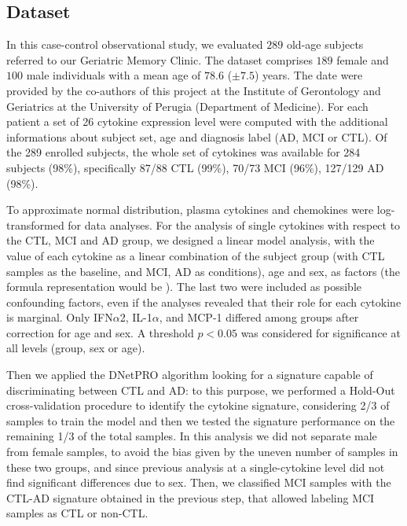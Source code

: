 \documentclass{standalone}
\begin{document}
\subsection[Dataset]{Dataset}\label{cytokine:cytokine_data}

In this case-control observational study, we evaluated $289$ old-age subjects referred to our Geriatric Memory Clinic.
The dataset comprises $189$ female and $100$ male individuals with a mean age of $78.6$ ($\pm7.5$) years.
The date were provided by the co-authors of this project at the Institute of Gerontology and Geriatrics at the University of Perugia (Department of Medicine).
For each patient a set of 26 cytokine expression level were computed with the additional informations about subject set, age and diagnosis label (AD, MCI or CTL).
Of the 289 enrolled subjects, the whole set of cytokines was available for 284 subjects (98\%), specifically 87/88 CTL (99\%), 70/73 MCI (96\%), 127/129 AD (98\%).

To approximate normal distribution, plasma cytokines and chemokines were log-transformed for data analyses.
For the analysis of single cytokines with respect to the CTL, MCI and AD group, we designed a linear model analysis, with the value of each cytokine as a linear combination of the subject group (with CTL samples as the baseline, and MCI, AD as conditions), age and sex, as factors (the formula representation would be ).
The last two were included as possible confounding factors, even if the analyses revealed that their role for each cytokine is marginal.
Only IFN$\alpha$2, IL-1$\alpha$, and MCP-1 differed among groups after correction for age and sex.
A threshold $p<0.05$ was considered for significance at all levels (group, sex or age).

Then we applied the DNetPRO algorithm looking for a signature capable of discriminating between CTL and AD: to this purpose, we performed a Hold-Out cross-validation procedure to identify the cytokine signature, considering 2/3 of samples to train the model and then we tested the signature performance on the remaining 1/3 of the total samples.
In this analysis we did not separate male from female samples, to avoid the bias given by the uneven number of samples in these two groups, and since previous analysis at a single-cytokine level did not find significant differences due to sex.
Then, we classified MCI samples with the CTL-AD signature obtained in the previous step, that allowed labeling MCI samples as CTL or non-CTL.

\end{document}

